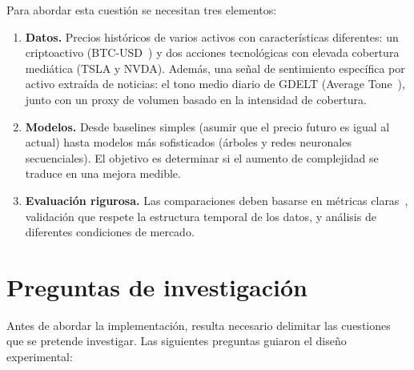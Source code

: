 Para abordar esta cuestión se necesitan tres elementos:

\begin{enumerate}
    \item \textbf{Datos.} Precios históricos de varios activos con características diferentes: un criptoactivo (BTC-USD~\cite{nakamoto2008bitcoin}) y dos acciones tecnológicas con elevada cobertura mediática (TSLA y NVDA). Además, una señal de sentimiento específica por activo extraída de noticias: el tono medio diario de GDELT (Average Tone~\cite{gdelt2024api}), junto con un proxy de volumen basado en la intensidad de cobertura.
    
    \item \textbf{Modelos.} Desde baselines simples (asumir que el precio futuro es igual al actual) hasta modelos más sofisticados (árboles y redes neuronales secuenciales). El objetivo es determinar si el aumento de complejidad se traduce en una mejora medible.
    
    \item \textbf{Evaluación rigurosa.} Las comparaciones deben basarse en métricas claras~\cite{hyndman2006another}, validación que respete la estructura temporal de los datos, y análisis de diferentes condiciones de mercado.
\end{enumerate}

\section{Preguntas de investigación}

Antes de abordar la implementación, resulta necesario delimitar las cuestiones que se pretende investigar. Las siguientes preguntas guiaron el diseño experimental:

